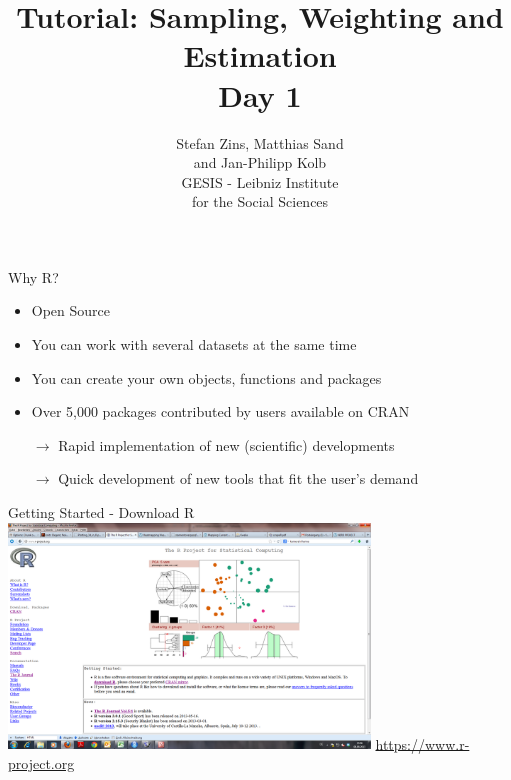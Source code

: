 \documentclass[11pt,german,hideothersubsections]{beamer}
\title[Day 1]{Tutorial: Sampling, Weighting and Estimation\\ \Large{Day 1} }
\author[M. Sand]{Stefan Zins, Matthias Sand\\ and Jan-Philipp Kolb\\ \vspace{.5cm} \footnotesize{GESIS - Leibniz Institute\\ for the Social Sciences}}
\date[]{\color{dunkelgrau}\footnotesize}
\begin{document}

\maketitle



\begin{frame}[fragile]{Why R?}
\begin{itemize}
\item Open Source 
\vspace{.25cm}
\item You can work with several datasets at the same time
\vspace{.25cm}
\item You can create your own objects, functions and packages
\vspace{.25cm}
\item Over 5,000 packages contributed by users available on CRAN
\vspace{.25cm}
\item[$\rightarrow$] Rapid implementation of new (scientific) developments
\vspace{.25cm}
\item[$\rightarrow$] Quick development of new tools that fit the user's demand
\end{itemize}
\end{frame}
\begin{frame}[fragile]{Getting Started - Download R}
\includegraphics[width=\linewidth, height=6cm]{../../../tutorial/figure/Rproject.png}
\vspace{.5cm}
\centering
\url{https://www.r-project.org}

\end{frame}
\end{document}
